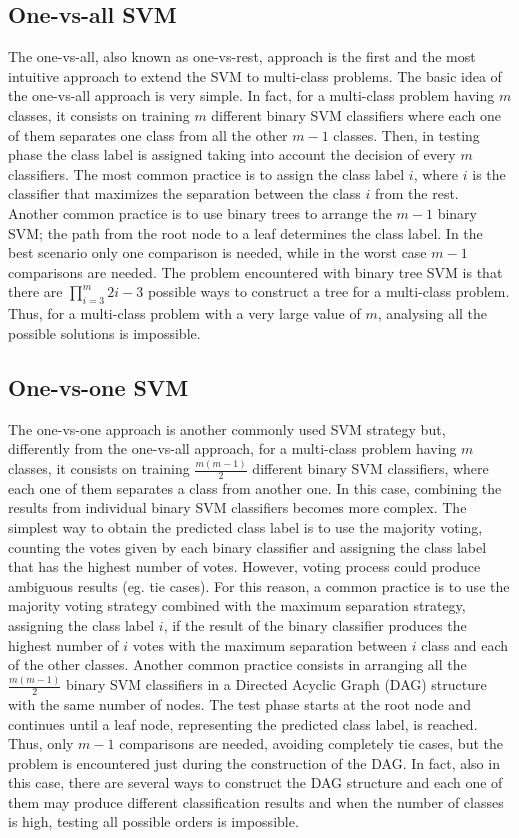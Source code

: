 \documentclass[final,a4paper,12pt,english]{UnicaPhdThesis3}
\begin{document}
\subsection{One-vs-all SVM} 
The one-vs-all, also known as one-vs-rest, approach is the first and the most intuitive approach to extend the SVM to multi-class problems. The basic idea of the one-vs-all approach is very simple. In fact, for a multi-class problem having $m$ classes, it consists on training $m$ different binary SVM classifiers where each one of them separates one class from all the other $m-1$ classes. Then, in testing phase the class label is assigned taking into account the decision of every $m$ classifiers. The most common practice is to assign the class label $i$, where $i$ is the classifier that maximizes the separation between the class $i$ from the rest. Another common practice is to use binary trees to arrange the $m-1$ binary SVM; the path from the root node to a leaf determines the class label. In the best scenario only one comparison is needed, while in the worst case  $m-1$ comparisons are needed. The problem encountered with binary tree SVM is that there are $\prod_{i=3}^{m}2i-3$ possible ways to construct a tree for a multi-class problem. Thus, for a multi-class problem with a very large value of $m$, analysing all the possible solutions is impossible.

\subsection{One-vs-one SVM}
The one-vs-one approach is another commonly used SVM strategy but, differently from the one-vs-all approach, for a multi-class problem having $m$ classes, it consists on training $\frac{m(m-1)}{2}$ different binary SVM classifiers, where each one of them separates a class from another one. In this case, combining the results from individual binary SVM classifiers becomes more complex. The simplest way to obtain the predicted class label is to use the majority voting, counting the votes given by each binary classifier and assigning the class label that has the highest number of votes. However, voting process could produce ambiguous results (eg. tie cases). For this reason, a common practice is to use the majority voting strategy combined with the maximum separation strategy, assigning the class label $i$, if the result of the binary classifier produces the highest number of $i$ votes with the maximum separation between $i$ class and each of the other classes. Another common practice consists in arranging all the $\frac{m(m-1)}{2}$ binary SVM classifiers in a Directed Acyclic Graph (\acs{DAG}) structure with the same number of nodes. The test phase starts at the root node and continues until a leaf node, representing the predicted class label, is reached. Thus, only $m-1$ comparisons are needed, avoiding completely tie cases, but the problem is encountered just during the construction of the DAG. In fact, also in this case, there are several ways to construct the DAG structure and each one of them may produce different classification results and when the number of classes is high, testing all possible orders is impossible.
\end{document}

